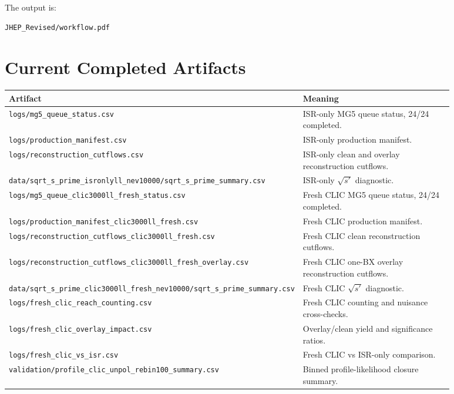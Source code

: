 \documentclass[11pt]{article}
\begin{document}
The output is:

\begin{lstlisting}
JHEP_Revised/workflow.pdf
\end{lstlisting}

\section{Current Completed Artifacts}

\begin{longtable}{@{}p{0.45\linewidth}p{0.43\linewidth}@{}}
\toprule
Artifact & Meaning \\
\midrule
\endhead
\texttt{logs/mg5\_queue\_status.csv} & ISR-only MG5 queue status, 24/24 completed. \\
\texttt{logs/production\_manifest.csv} & ISR-only production manifest. \\
\texttt{logs/reconstruction\_cutflows.csv} & ISR-only clean and overlay reconstruction cutflows. \\
\texttt{data/sqrt\_s\_prime\_isronlyll\_nev10000/sqrt\_s\_prime\_summary.csv} & ISR-only $\sqrt{s'}$ diagnostic. \\
\texttt{logs/mg5\_queue\_clic3000ll\_fresh\_status.csv} & Fresh CLIC MG5 queue status, 24/24 completed. \\
\texttt{logs/production\_manifest\_clic3000ll\_fresh.csv} & Fresh CLIC production manifest. \\
\texttt{logs/reconstruction\_cutflows\_clic3000ll\_fresh.csv} & Fresh CLIC clean reconstruction cutflows. \\
\texttt{logs/reconstruction\_cutflows\_clic3000ll\_fresh\_overlay.csv} & Fresh CLIC one-BX overlay reconstruction cutflows. \\
\texttt{data/sqrt\_s\_prime\_clic3000ll\_fresh\_nev10000/sqrt\_s\_prime\_summary.csv} & Fresh CLIC $\sqrt{s'}$ diagnostic. \\
\texttt{logs/fresh\_clic\_reach\_counting.csv} & Fresh CLIC counting and nuisance cross-checks. \\
\texttt{logs/fresh\_clic\_overlay\_impact.csv} & Overlay/clean yield and significance ratios. \\
\texttt{logs/fresh\_clic\_vs\_isr.csv} & Fresh CLIC vs ISR-only comparison. \\
\texttt{validation/profile\_clic\_unpol\_rebin100\_summary.csv} & Binned profile-likelihood closure summary. \\
\bottomrule
\end{longtable}
\end{document}
